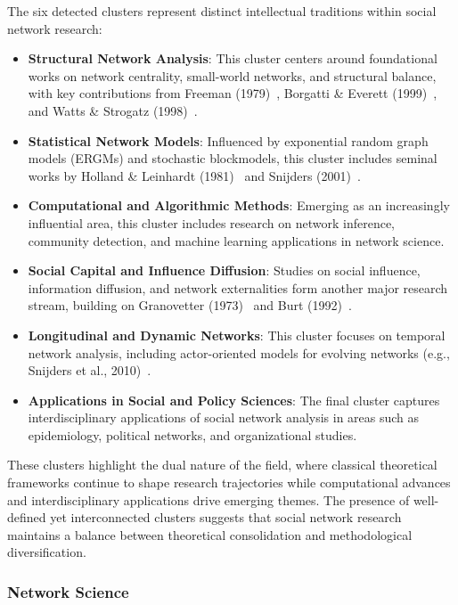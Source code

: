 \documentclass[twocolumn]{article}
\begin{document}
	The six detected clusters represent distinct intellectual traditions within social network research:
	
	\begin{itemize}
		\item \textbf{Structural Network Analysis}: This cluster centers around foundational works on network centrality, small-world networks, and structural balance, with key contributions from Freeman (1979)~\cite{Freeman1979}, Borgatti \& Everett (1999)~\cite{borgatti1999core}, and Watts \& Strogatz (1998)~\cite{watts1998collective}.
		\item \textbf{Statistical Network Models}: Influenced by exponential random graph models (ERGMs) and stochastic blockmodels, this cluster includes seminal works by Holland \& Leinhardt (1981)~\cite{holland1981exponential} and Snijders (2001)~\cite{snijders2001statistical}.
		\item \textbf{Computational and Algorithmic Methods}: Emerging as an increasingly influential area, this cluster includes research on network inference, community detection, and machine learning applications in network science.
		\item \textbf{Social Capital and Influence Diffusion}: Studies on social influence, information diffusion, and network externalities form another major research stream, building on Granovetter (1973)~\cite{granovetter1973strength} and Burt (1992)~\cite{burt1992structural}.
		\item \textbf{Longitudinal and Dynamic Networks}: This cluster focuses on temporal network analysis, including actor-oriented models for evolving networks (e.g., Snijders et al., 2010)~\cite{snijders2010introduction}.
		\item \textbf{Applications in Social and Policy Sciences}: The final cluster captures interdisciplinary applications of social network analysis in areas such as epidemiology, political networks, and organizational studies.
	\end{itemize}
	
	
	These clusters highlight the dual nature of the field, where classical theoretical frameworks continue to shape research trajectories while computational advances and interdisciplinary applications drive emerging themes. The presence of well-defined yet interconnected clusters suggests that social network research maintains a balance between theoretical consolidation and methodological diversification.
	
	\subsubsection*{Network Science}
		
\end{document}
